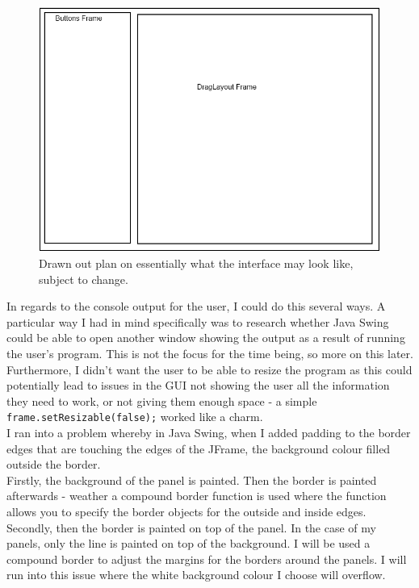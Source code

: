\documentclass[a4paper, 12pt]{article}
\begin{document}
            \clearpage
            \begin{figure}[h]
                \centering
                \includegraphics[width=120mm]{design.png}
                \caption{Drawn out plan on essentially what the interface may look like, subject to change.}
            \end{figure}

            In regards to the console output for the user, I could do this several ways. A particular way
            I had in mind specifically was to research whether Java Swing could be able to open another
            window showing the output as a result of running the user's program. This is not the focus
            for the time being, so more on this later. Furthermore, I didn't want the user to be able
            to resize the program as this could potentially lead to issues in the GUI not showing the
            user all the information they need to work, or not giving them enough space - a simple
            \texttt{frame.setResizable(false);} worked like a charm. \\

            I ran into a problem whereby in Java Swing, when I added padding to the border edges that
            are touching the edges of the JFrame, the background colour filled outside the border. \\

            \clearpage
            Firstly, the background of the panel is painted. Then the border is painted afterwards
            - weather a compound border function is used where the function allows you to
            specify the border objects for the outside and inside edges. Secondly, then the border
            is painted on top of the panel. In the case of my panels, only the line is painted on
            top of the background. I will be used a compound border to adjust the margins for the
            borders around the panels. I will run into this issue where the white background colour
            I choose will overflow. \\
\end{document}
